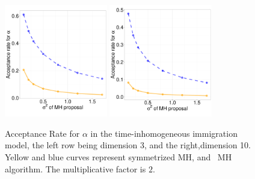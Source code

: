 {\begin{figure}[H]
  \begin{minipage}[!hp]{0.99\linewidth}
    \includegraphics [width=0.40\textwidth, angle=0]{figs/acc/CQ_D3alpha_k2.pdf}
	\hspace{.5in}
    \includegraphics [width=0.40\textwidth, angle=0]{figs/acc/CQ_D10alpha_k2.pdf}
  \end{minipage}
    \caption{Acceptance Rate for $\alpha$ in the time-inhomogeneous immigration model, the left row being dimension 3, and the right,dimension 10.  Yellow and blue curves represent symmetrized MH,
 and \naive\ MH  algorithm. The multiplicative factor is $2$. }
     \label{fig:ACC_CQ}
  \end{figure}

}
